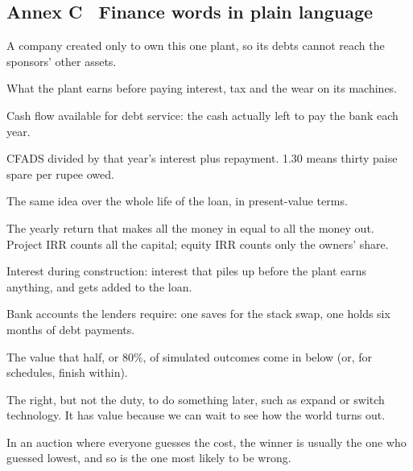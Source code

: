 \subsection*{Annex C \textbullet\ Finance words in plain language}
\begin{description}[leftmargin=0pt,itemsep=3pt,font=\color{ink}\bfseries]
\item[SPV] A company created only to own this one plant, so its debts cannot reach the sponsors' other assets.
\item[EBITDA] What the plant earns before paying interest, tax and the wear on its machines.
\item[CFADS] Cash flow available for debt service: the cash actually left to pay the bank each year.
\item[DSCR] CFADS divided by that year's interest plus repayment. 1.30 means thirty paise spare per rupee owed.
\item[LLCR] The same idea over the whole life of the loan, in present-value terms.
\item[IRR] The yearly return that makes all the money in equal to all the money out. Project IRR counts all the capital; equity IRR counts only the owners' share.
\item[IDC] Interest during construction: interest that piles up before the plant earns anything, and gets added to the loan.
\item[MMRA / DSRA] Bank accounts the lenders require: one saves for the stack swap, one holds six months of debt payments.
\item[P50 / P80] The value that half, or 80\%, of simulated outcomes come in below (or, for schedules, finish within).
\item[Real option] The right, but not the duty, to do something later, such as expand or switch technology. It has value because we can wait to see how the world turns out.
\item[Winner's curse] In an auction where everyone guesses the cost, the winner is usually the one who guessed lowest, and so is the one most likely to be wrong.
\end{description}
\newpage
